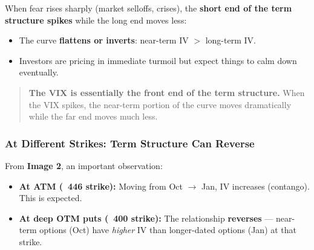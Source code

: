 \documentclass[12pt,openany]{book}
\begin{document}
When fear rises sharply (market selloffs, crises), the \textbf{short end of the term structure spikes} while the long end moves less:


\begin{center}
\end{center}


\begin{itemize}[leftmargin=*]
    \item The curve \textbf{flattens or inverts}: near-term IV \(>\) long-term IV.
    \item Investors are pricing in immediate turmoil but expect things to calm down eventually.
\end{itemize}

\begin{quote}
\textbf{The VIX is essentially the front end of the term structure.} When the VIX spikes, the near-term portion of the curve moves dramatically while the far end moves much less.
\end{quote}

\subsubsection{At Different Strikes: Term Structure Can Reverse}

From \textbf{Image 2}, an important observation:

\begin{itemize}[leftmargin=*]
    \item \textbf{At ATM (~446 strike):} Moving from Oct \(\rightarrow\) Jan, IV increases (contango). This is expected.
    \item \textbf{At deep OTM puts (~400 strike):} The relationship \textbf{reverses} — near-term options (Oct) have \emph{higher} IV than longer-dated options (Jan) at that strike.
\end{itemize}
\end{document}
